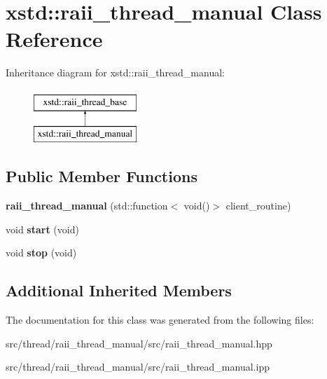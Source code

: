 \hypertarget{classxstd_1_1raii__thread__manual}{\section{xstd\-:\-:raii\-\_\-thread\-\_\-manual Class Reference}
\label{classxstd_1_1raii__thread__manual}
}
Inheritance diagram for xstd\-:\-:raii\-\_\-thread\-\_\-manual\-:\begin{figure}[H]
\begin{center}
\leavevmode
\includegraphics[height=2.000000cm]{classxstd_1_1raii__thread__manual}
\end{center}
\end{figure}
\subsection*{Public Member Functions}
\begin{DoxyCompactItemize}
\item 
\hypertarget{classxstd_1_1raii__thread__manual_a7a6c9e815d104ba820b3deaa5eef4000}{{\bfseries raii\-\_\-thread\-\_\-manual} (std\-::function$<$ void()$>$ client\-\_\-routine)}\label{classxstd_1_1raii__thread__manual_a7a6c9e815d104ba820b3deaa5eef4000}

\item 
\hypertarget{classxstd_1_1raii__thread__manual_a4998457f902ae8515ba0a37a8c78e37a}{void {\bfseries start} (void)}\label{classxstd_1_1raii__thread__manual_a4998457f902ae8515ba0a37a8c78e37a}

\item 
\hypertarget{classxstd_1_1raii__thread__manual_a00dc2a5fc7895b700a88afcdb9fa0f23}{void {\bfseries stop} (void)}\label{classxstd_1_1raii__thread__manual_a00dc2a5fc7895b700a88afcdb9fa0f23}

\end{DoxyCompactItemize}
\subsection*{Additional Inherited Members}


The documentation for this class was generated from the following files\-:\begin{DoxyCompactItemize}
\item 
src/thread/raii\-\_\-thread\-\_\-manual/src/raii\-\_\-thread\-\_\-manual.\-hpp\item 
src/thread/raii\-\_\-thread\-\_\-manual/src/raii\-\_\-thread\-\_\-manual.\-ipp\end{DoxyCompactItemize}
